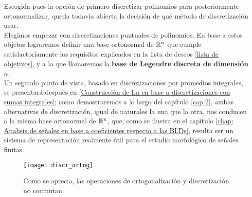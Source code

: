 Escogida pues la opción de primero 
discretizar polinomios para posteriormente
ortonormalizar, queda todavía abierta
la decisión de qué método de discretización usar. \\

Elegimos empezar
con discretizaciones puntuales de polinomios.
En base a estos objetos lograremos definir
una base ortonormal de $\mathbb{R}^{n}$ que cumple satisfactoriamente
los requisitos explicados en la lista de deseos
\ref{lista de objetivos}, y a la que llamaremos
la \textbf{base de Legendre discreta de dimensión $n$}. \\

Un segundo punto de vista, basado
en discretizaciones por promedios integrales,
se presentará después en
\ref{Construcción de Ln en base a discretizaciones con sumas integrales}; 
como demostraremos a lo largo del capítulo \ref{cap 2}, 
ambas alternativas
de discretización, igual de naturales la una que la otra, nos
conducen a la misma base ortonormal de $\mathbb{R}^{n}$,
que, como se ilustra en el capítulo 
\ref{chap: Analisis de señales en base a coeficientes respecto a las BLDs},
resulta ser un sistema de representación
realmente útil para el estudio morfológico de señales finitas.

\newpage %

\begin{figure}[H]
\centering\captionsetup{format = hang}
	\begin{measuredfigure}
		\label{fig: ortogonalizacion, discretizacion}
		\texttt{[image: discr\_ortog]} 
		\caption{Como se aprecia, las operaciones de
		ortogonalización y discretización no conmutan.}
 	\end{measuredfigure}
 \end{figure}